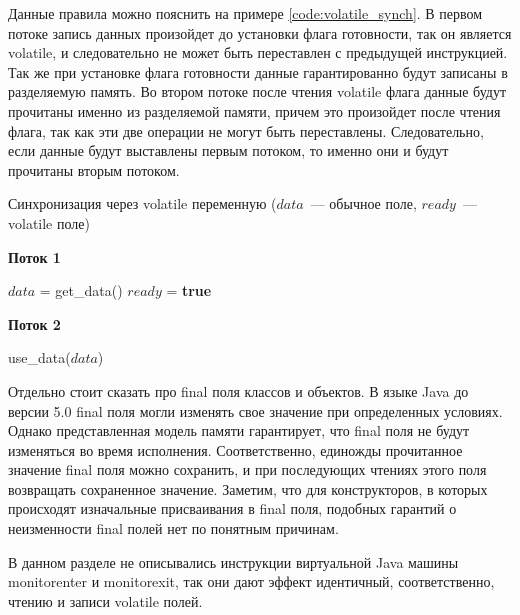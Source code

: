 \documentclass[14pt,titlepage]{extarticle}
\newcommand{\algorithmictitle}[1]{\hspace{8mm}\textbf{#1}}
\newcommand{\BOOLTRUE}{\textbf{true }}
\newcommand{\eng}[1]{{\English#1}}
\begin{document}
      Данные правила можно пояснить на примере \ref{code:volatile_synch}.
      В первом потоке запись данных произойдет до установки флага готовности,
      так он является \eng{volatile}, и следовательно не может быть переставлен
      с предыдущей инструкцией. Так же при установке флага готовности данные
      гарантированно будут записаны в разделяемую память.
      Во втором потоке после чтения \eng{volatile} флага данные будут прочитаны
      именно из разделяемой памяти, причем это произойдет после чтения флага,
      так как эти две операции не могут быть переставлены.
      Следовательно, если данные будут выставлены первым потоком, то именно
      они и будут прочитаны вторым потоком.
      \begin{algorithm}
        \caption{Синхронизация через \eng{volatile} переменную
          ($data$~--- обычное поле, $ready$~--- \eng{volatile} поле)}
        \label{code:volatile_synch}
        \begin{multicols*}{2}
          \algorithmictitle{Поток 1}
          \begin{algorithmic}[1]
            \STATE $data$ = get\_data()
            \STATE $ready$ = \BOOLTRUE
          \end{algorithmic}
          \columnbreak
          \algorithmictitle{Поток 2}
          \begin{algorithmic}[1]
            \STATE {}
            \ENDWHILE
            \STATE use\_data($data$)
          \end{algorithmic}
        \end{multicols*}
      \end{algorithm}

      Отдельно стоит сказать про \eng{final} поля классов и объектов.
      В языке Java до версии 5.0 \eng{final} поля могли изменять свое значение
      при определенных условиях. Однако представленная модель памяти
      гарантирует, что \eng{final} поля не будут изменяться во время
      исполнения. Соответственно, единожды прочитанное значение \eng{final}
      поля можно сохранить, и при последующих чтениях этого поля возвращать
      сохраненное значение.
      Заметим, что для конструкторов, в которых происходят изначальные
      присваивания в \eng{final} поля, подобных гарантий о неизменности
      \eng{final} полей нет по понятным причинам.

      В данном разделе не описывались инструкции виртуальной Java машины
      monitorenter и monitorexit, так они дают эффект идентичный,
      соответственно, чтению и записи \eng{volatile} полей.
\end{document}
